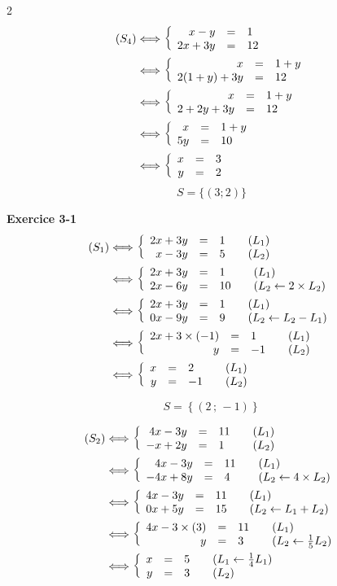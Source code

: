\documentclass[10pt,a4paper,openany,twoside, eleve]{book}
\begin{document}
\begin{multicols}{2}
\begin{align*}
   (S_4)
   &\Longleftrightarrow \left\{\begin{array}{rcl} x - y&=&1 \\ 2x + 3y&=&12 \end{array}\right. \\
   &\Longleftrightarrow \left\{\begin{array}{rcl} x&=&1 + y \\ 2(1 + y) + 3y&=&12 \end{array}\right. \\
   &\Longleftrightarrow \left\{\begin{array}{rcl} x&=&1 + y \\ 2 + 2y + 3y&=&12 \end{array}\right. \\
   &\Longleftrightarrow \left\{\begin{array}{rcl} x&=&1 + y \\ 5y&=&10 \end{array}\right. \\
   &\Longleftrightarrow \left\{\begin{array}{rcl} x&=&3 \\ y&=&2  \end{array}\right.
   \end{align*}
   $$S = \{ (3;2) \}$$

\bfseries Exercice 3-1
\begin{align*}
   (S_1)
   &\Longleftrightarrow \left\{ \begin{array}{rcll} 2x + 3y &=& 1 &\quad (L_1) \\ x - 3y &=& 5 &\quad (L_2) \end{array} \right. \\
   &\Longleftrightarrow \left\{ \begin{array}{rcll} 2x + 3y &=& 1 &\quad (L_1) \\ 2x - 6y &=& 10 &\quad (L_2 \leftarrow 2 \times L_2) \end{array} \right. \\
   &\Longleftrightarrow \left\{ \begin{array}{rcll} 2x + 3y &=& 1 &\quad (L_1) \\ 0x - 9y &=& 9 &\quad (L_2 \leftarrow L_2 - L_1) \end{array} \right. \\
   &\Longleftrightarrow \left\{ \begin{array}{rcll} 2x +3\times(-1)&=& 1 &\quad (L_1) \\ y &=& -1 &\quad (L_2) \end{array} \right. \\
   &\Longleftrightarrow \left\{ \begin{array}{rcll} x &=& 2 &\quad (L_1) \\ y &=& -1 &\quad (L_2) \end{array} \right.
\end{align*}

   $$S = \left\{ \left(2\,;\,-1\right) \right\}$$

   \begin{align*}
      (S_2)
      &\Longleftrightarrow \left\{ \begin{array}{rcll} 4x - 3y &=& 11 &\quad (L_1) \\ -x + 2y &=& 1 &\quad (L_2) \end{array} \right. \\
      &\Longleftrightarrow \left\{ \begin{array}{rcll} 4x - 3y &=& 11 &\quad (L_1) \\ -4x + 8y &=& 4 &\quad (L_2 \leftarrow 4 \times L_2) \end{array} \right. \\
      &\Longleftrightarrow \left\{ \begin{array}{rcll} 4x - 3y &=& 11 &\quad (L_1) \\ 0x + 5y &=& 15 &\quad (L_2 \leftarrow L_1 + L_2) \end{array} \right. \\
      &\Longleftrightarrow \left\{ \begin{array}{rcll} 4x - 3\times\left(3\right) &=& 11 &\quad (L_1) \\ y &=& 3 &\quad (L_2 \leftarrow \frac{1}{5}L_2) \end{array} \right. \\
      &\Longleftrightarrow \left\{ \begin{array}{rcll} x &=& 5 &\quad (L_1 \leftarrow \frac{1}{4}L_1) \\ y &=& 3 &\quad (L_2) \end{array} \right.
      \end{align*}


\end{multicols}
\end{document}
